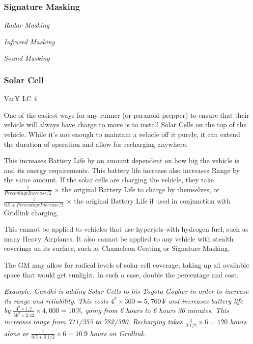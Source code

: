 \begin{multicols*}{2}
	\subsubsection{Signature Masking}
	
	\textit{Radar Masking}
	
	\textit{Infrared Masking}
	
	\textit{Sound Masking}
	
	\subsubsection{Solar Cell}
	Var¥ LC 4
	
	One of the easiest ways for any runner (or paranoid prepper) to ensure that their vehicle will always have charge to move is to install Solar Cells on the top of the vehicle. While it's not enough to maintain a vehicle off it purely, it can extend the duration of operation and allow for recharging anywhere.
	
	This increases Battery Life by an amount dependent on how big the vehicle is and its energy requirements. This battery life increase also increases Range by the same amount. If the solar cells are charging the vehicle, they take $\frac{1}{Percentage Increase/2}$ $\times$ the original Battery Life to charge by themselves, or $\frac{1}{0.5 + Percentage Increase/2}$ $\times$ the original Battery Life if used in conjunction with Gridlink charging.
	
	This cannot be applied to vehicles that use hyperjets with hydrogen fuel, such as many Heavy Airplanes. It also cannot be applied to any vehicle with stealth coverings on its surface, such as Chameleon Coating or Signature Masking.
	

	The GM may allow for radical levels of solar cell coverage, taking up all available space that would get sunlight. In such a case, double the percentage and cost.

	\textcolor{OliveGreen}{\textit{Example: Gandhi is adding Solar Cells to his Toyota Gopher in order to increase its range and reliability. This costs $4^2 \times 360 = 5,760$¥ and increases battery life by $\frac{4^2 \times 1.2}{56^2 \times 2.42} \times 4,000 = 10$\%, going from 6 hours to 6 hours 36 minutes. This increases range from 711/355 to 782/390. Recharging takes $\frac{1}{0.1/2} \times 6 = 120$ hours alone or $\frac{1}{0.5 + 0.1/2} \times 6 = 10.9$ hours on Gridlink.}}
	

\end{multicols*}
